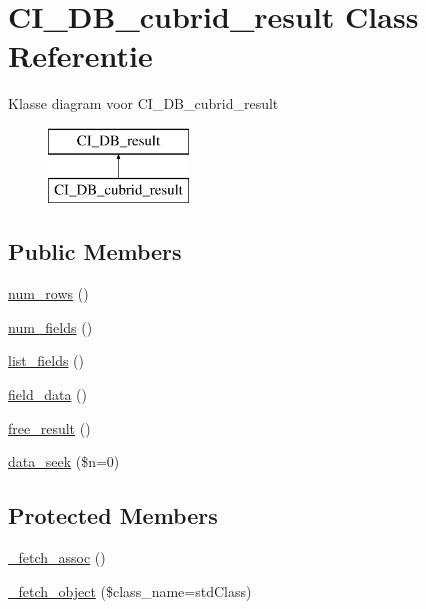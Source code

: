 \hypertarget{class_c_i___d_b__cubrid__result}{}\section{C\+I\+\_\+\+D\+B\+\_\+cubrid\+\_\+result Class Referentie}
\label{class_c_i___d_b__cubrid__result}
Klasse diagram voor C\+I\+\_\+\+D\+B\+\_\+cubrid\+\_\+result\begin{figure}[H]
\begin{center}
\leavevmode
\includegraphics[height=2.000000cm]{class_c_i___d_b__cubrid__result}
\end{center}
\end{figure}
\subsection*{Public Members}
\begin{DoxyCompactItemize}
\item 
\mbox{\hyperlink{class_c_i___d_b__cubrid__result_a218657c303ee499b97710ab0cd2f5d6e}{num\+\_\+rows}} ()
\item 
\mbox{\hyperlink{class_c_i___d_b__cubrid__result_af831bf363e4d7d661a717a4932af449d}{num\+\_\+fields}} ()
\item 
\mbox{\hyperlink{class_c_i___d_b__cubrid__result_a50b54eb4ea7cfd039740f532988ea776}{list\+\_\+fields}} ()
\item 
\mbox{\hyperlink{class_c_i___d_b__cubrid__result_a84bffd65e53902ade1591716749a33e3}{field\+\_\+data}} ()
\item 
\mbox{\hyperlink{class_c_i___d_b__cubrid__result_aad2d98d6beb3d6095405356c6107b473}{free\+\_\+result}} ()
\item 
\mbox{\hyperlink{class_c_i___d_b__cubrid__result_a8255ae91816e4206e29eb7581c5af0f1}{data\+\_\+seek}} (\$n=0)
\end{DoxyCompactItemize}
\subsection*{Protected Members}
\begin{DoxyCompactItemize}
\item 
\mbox{\hyperlink{class_c_i___d_b__cubrid__result_a43a9a92817f1334a1c10752ec44275a0}{\+\_\+fetch\+\_\+assoc}} ()
\item 
\mbox{\hyperlink{class_c_i___d_b__cubrid__result_a60806be6a9c2488820813c2a7f4fef71}{\+\_\+fetch\+\_\+object}} (\$class\+\_\+name=\textquotesingle{}std\+Class\textquotesingle{})
\end{DoxyCompactItemize}
